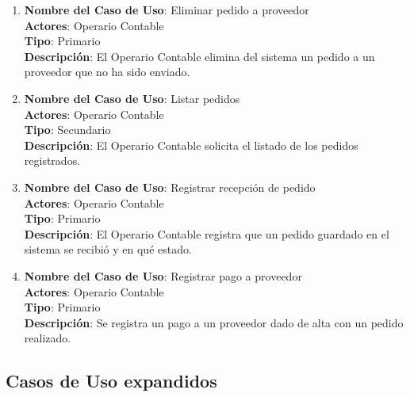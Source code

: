 \documentclass[12pt]{extarticle}
\begin{document}
\begin{spacing}{1.2}
\begin{enumerate}
            \item 	\textbf{Nombre del Caso de Uso}: Eliminar pedido a proveedor\\
                    \textbf{Actores}: Operario Contable\\
                    \textbf{Tipo}: Primario\\
                    \textbf{Descripción}: El Operario Contable elimina del sistema un pedido a un proveedor que no ha sido enviado.


            \item 	\textbf{Nombre del Caso de Uso}: Listar pedidos \\
                    \textbf{Actores}: Operario Contable\\
                    \textbf{Tipo}: Secundario\\
                    \textbf{Descripción}: El Operario Contable solicita el listado de los pedidos registrados.

            \item 	\textbf{Nombre del Caso de Uso}: Registrar recepción de pedido\\
                    \textbf{Actores}: Operario Contable\\
                    \textbf{Tipo}: Primario\\
                    \textbf{Descripción}: El Operario Contable registra que un pedido guardado en el sistema se recibió y en qué estado. 

            \item 	\textbf{Nombre del Caso de Uso}: Registrar pago a proveedor\\
                    \textbf{Actores}: Operario Contable\\
                    \textbf{Tipo}: Primario\\
                    \textbf{Descripción}: Se registra un pago a un proveedor dado de alta con un pedido realizado.
        \end{enumerate}
        \clearpage
        \subsection{Casos de Uso expandidos}



        \newcommand\inc{\stepcounter{step}\textbf{\thestep. }}




\end{spacing}
\end{document}
